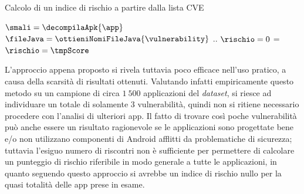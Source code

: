 \documentclass[12pt,a4paper,oneside]{article}
\begin{document}
\begin{algorithm}[!htb]
    \caption{Calcolo di un indice di rischio a partire dalla lista \gls{CVE}}
    \label{alg:vulnerability_check}
    \BlankLine
    \BlankLine
    $\smali = \decompilaApk{\app}$\;
    {
        $\fileJava = \ottieniNomiFileJava{\vulnerability}$\;
        {
            {
                \app.\vulnList.\aggiungi{\vulnerability}\;
            }
        }     
    }
    \BlankLine
    $\rischio = 0$\;
    \BlankLine
    {
        \tmpScore = \scoreCVSS{\vulnerability}\;
        \If{$\tmpScore > \rischio$}
        {
            $\rischio = \tmpScore$\;
        }  
    }
    \BlankLine
    \Return \rischio\;
\end{algorithm}

\noindent L'approccio appena proposto si rivela tuttavia poco efficace nell'uso pratico, a causa della scarsità di risultati ottenuti. Valutando infatti empiricamente questo metodo su un campione di circa $1~500$ applicazioni del \textit{dataset}, si riesce ad individuare un totale di solamente $3$ vulnerabilità, quindi non si ritiene necessario procedere con l'analisi di ulteriori app. Il fatto di trovare così poche vulnerabilità può anche essere un risultato ragionevole se le applicazioni sono progettate bene e/o non utilizzano componenti di Android afflitti da problematiche di sicurezza; tuttavia l'esiguo numero di riscontri non è sufficiente per permettere di calcolare un punteggio di rischio riferibile in modo generale a tutte le applicazioni, in quanto seguendo questo approccio si avrebbe un indice di rischio nullo per la quasi totalità delle app prese in esame.
\newline
\end{document}
